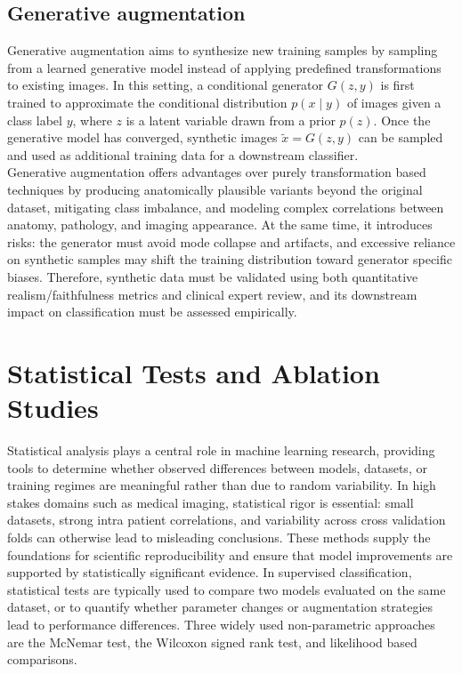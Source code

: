 \subsection{Generative augmentation}

Generative augmentation aims to synthesize new training samples by sampling from a learned generative model instead of applying predefined transformations to existing images. In this setting, a conditional generator $G(z, y)$ is first trained to approximate the conditional distribution $p(x \mid y)$ of images given a class label $y$, where $z$ is a latent variable drawn from a prior $p(z)$. Once the generative model has converged, synthetic images $\tilde{x} = G(z, y)$ can be sampled and used as additional training data for a downstream classifier.\\

Generative augmentation offers advantages over purely transformation based techniques by producing anatomically plausible variants beyond the original dataset, mitigating class imbalance, and modeling complex correlations between anatomy, pathology, and imaging appearance. At the same time, it introduces risks: the generator must avoid mode collapse and artifacts, and excessive reliance on synthetic samples may shift the training distribution toward generator specific biases. Therefore, synthetic data must be validated using both quantitative realism/faithfulness metrics and clinical expert review, and its downstream impact on classification must be assessed empirically.

\section{Statistical Tests and Ablation Studies}


Statistical analysis plays a central role in machine learning research, providing tools to determine whether observed differences between models, datasets, or training regimes are meaningful rather than due to random variability. In high stakes domains such as medical imaging, statistical rigor is essential: small datasets, strong intra patient correlations, and variability across cross validation folds can otherwise lead to misleading conclusions. These methods supply the foundations for scientific reproducibility and ensure that model improvements are supported by statistically significant evidence. In supervised classification, statistical tests are typically used to compare two models evaluated on the same dataset, or to quantify whether parameter changes or augmentation strategies lead to performance differences. Three widely used non-parametric approaches are the McNemar test, the Wilcoxon signed rank test, and likelihood based comparisons.\\

